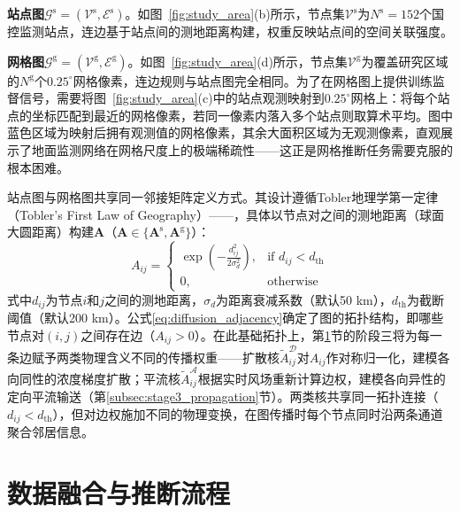 \textbf{站点图$\mathcal{G}^{\text{s}} = (\mathcal{V}^{\text{s}}, \mathcal{E}^{\text{s}})$}。如图~\ref{fig:study_area}(b)所示，节点集$\mathcal{V}^{\text{s}}$为$N^{\text{s}} = 152$个国控监测站点，连边基于站点间的测地距离构建，权重反映站点间的空间关联强度。

\textbf{网格图$\mathcal{G}^{\text{g}} = (\mathcal{V}^{\text{g}}, \mathcal{E}^{\text{g}})$}。如图~\ref{fig:study_area}(d)所示，节点集$\mathcal{V}^{\text{g}}$为覆盖研究区域的$N^{\text{g}}$个$0.25^{\circ}$网格像素，连边规则与站点图完全相同。为了在网格图上提供训练监督信号，需要将图~\ref{fig:study_area}(c)中的站点观测映射到$0.25^{\circ}$网格上：将每个站点的坐标匹配到最近的网格像素，若同一像素内落入多个站点则取算术平均。图中蓝色区域为映射后拥有观测值的网格像素，其余大面积区域为无观测像素，直观展示了地面监测网络在网格尺度上的极端稀疏性——这正是网格推断任务需要克服的根本困难。

站点图与网格图共享同一邻接矩阵定义方式。其设计遵循Tobler地理学第一定律（Tobler's First Law of Geography）——，具体以节点对之间的测地距离（球面大圆距离）构建$\mathbf{A}$（$\mathbf{A} \in \{\mathbf{A}^{\text{s}}, \mathbf{A}^{\text{g}}\}$）：
\begin{equation}
    A_{ij} = \begin{cases}
        \exp\left(-\frac{d_{ij}^2}{2\sigma_d^2}\right), & \text{if } d_{ij} < d_{\text{th}} \\
        0, & \text{otherwise}
    \end{cases}
\label{eq:diffusion_adjacency}
\end{equation}
\noindent 式中$d_{ij}$为节点$i$和$j$之间的测地距离，$\sigma_d$为距离衰减系数（默认50 km），$d_{\text{th}}$为截断阈值（默认200 km）。公式\eqref{eq:diffusion_adjacency}确定了图的拓扑结构，即哪些节点对$(i,j)$之间存在边（$A_{ij}>0$）。在此基础拓扑上，第\ref{sec:spin_model}节的阶段三将为每一条边赋予两类物理含义不同的传播权重——扩散核$\tilde{A}^{\mathcal{D}}_{ij}$对$A_{ij}$作对称归一化，建模各向同性的浓度梯度扩散；平流核$\tilde{A}^{\mathcal{A}}_{ij}$根据实时风场重新计算边权，建模各向异性的定向平流输送（第\ref{subsec:stage3_propagation}节）。两类核共享同一拓扑连接（$d_{ij} < d_{\text{th}}$），但对边权施加不同的物理变换，在图传播时每个节点同时沿两条通道聚合邻居信息。


\section{数据融合与推断流程}
\label{sec:spin_model}

